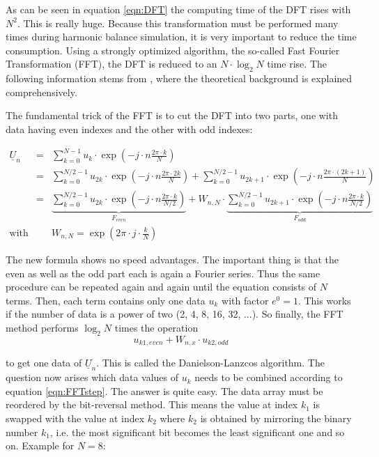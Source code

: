 \addvspace{12pt}

As can be seen in equation \ref{eqn:DFT} the computing time of the
DFT rises with $N^2$. This is really huge. Because this transformation
must be performed many times during harmonic balance simulation, it is
very important to reduce the time consumption. Using a strongly
optimized algorithm, the so-called Fast Fourier Transformation (FFT),
the DFT is reduced to an $N\cdot\log_2 N$ time rise.
The following information stems from \cite{Press},
where the theoretical background is explained comprehensively.

\addvspace{12pt}

The fundamental trick of the FFT is to cut the DFT into two parts,
one with data having even indexes and the other with odd indexes:

\begin{eqnarray}
\underline{U}_n & = &
  \sum_{k=0}^{N-1} u_k\cdot \exp\left( -j\cdot n\frac{2\pi\cdot k}{N} \right) \\
  & = & \sum_{k=0}^{N/2-1} u_{2k}\cdot
        \exp\left( -j\cdot n\frac{2\pi\cdot 2k}{N} \right) +
        \sum_{k=0}^{N/2-1} u_{2k+1}\cdot
        \exp\left( -j\cdot n\frac{2\pi\cdot (2k+1)}{N} \right) \\
  & = & \underbrace{ \sum_{k=0}^{N/2-1} u_{2k}\cdot
        \exp\left( -j\cdot n\frac{2\pi\cdot k}{N/2} \right) }_{F_{even}} +
        W_{n,N}\cdot \underbrace{ \sum_{k=0}^{N/2-1} u_{2k+1}\cdot
        \exp\left( -j\cdot n\frac{2\pi\cdot k}{N/2} \right) }_{F_{odd}} \\
\text{with} & & W_{n,N} = \exp\left( 2\pi\cdot j\cdot \frac{k}{N} \right)
\end{eqnarray}

The new formula shows no speed advantages. The important thing is that
the even as well as the odd part each is again a Fourier series. Thus
the same procedure can be repeated again and again until the equation
consists of $N$ terms. Then, each term contains only one data $u_k$
with factor $e^0=1$. This works if the number of data is a power of
two (2, 4, 8, 16, 32, ...).
So finally, the FFT method performs $\log_2 N$ times the operation
\begin{equation}
\label{eqn:FFTstep}
u_{k1,even} + W_{n,x}\cdot u_{k2,odd}
\end{equation}

to get one data of $\underline{U}_n$. This is called the
Danielson-Lanzcos algorithm.
The question now arises which data values of $u_k$
needs to be combined according to equation \ref{eqn:FFTstep}.
The answer is quite easy. The data array must be reordered by the
bit-reversal method. This means the value at index $k_1$ is swapped
with the value at index $k_2$ where $k_2$ is obtained by mirroring
the binary number $k_1$, i.e. the most significant bit becomes the
least significant one and so on. Example for $N=8$:

